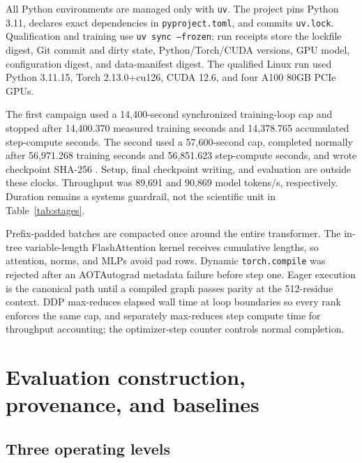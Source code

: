 \documentclass{article}
\newcommand{\code}[1]{\texttt{#1}}
\begin{document}
All Python environments are managed only with \texttt{uv}. The project pins
Python 3.11, declares exact dependencies in \code{pyproject.toml}, and commits
\code{uv.lock}. Qualification and training use \code{uv sync --frozen}; run
receipts store the lockfile digest, Git commit and dirty state, Python/Torch/CUDA
versions, GPU model, configuration digest, and data-manifest digest. The
qualified Linux run used Python 3.11.15, Torch 2.13.0+cu126, CUDA 12.6, and four
A100 80GB PCIe GPUs.

The first campaign used a 14,400-second synchronized training-loop cap and
stopped after 14,400.370 measured training seconds and 14,378.765 accumulated
step-compute seconds. The second used a 57,600-second cap, completed normally
after 56,971.268 training seconds and 56,851.623 step-compute seconds, and
wrote checkpoint SHA-256
.
Setup, final checkpoint writing, and evaluation are outside these clocks.
Throughput was 89,691 and 90,869 model tokens/s, respectively. Duration remains
a systems guardrail, not the scientific unit in Table~\ref{tab:stages}.

Prefix-padded batches are compacted once around the entire transformer. The
in-tree variable-length FlashAttention kernel receives cumulative lengths, so
attention, norms, and MLPs avoid pad rows. Dynamic \code{torch.compile} was
rejected after an AOTAutograd metadata failure before step one. Eager execution
is the canonical path until a compiled graph passes parity at the 512-residue
context. DDP max-reduces elapsed wall time at loop boundaries so every rank
enforces the same cap, and separately max-reduces step compute time for
throughput accounting; the optimizer-step counter controls normal completion.

\section{Evaluation construction, provenance, and baselines}
\label{app:evaluation}

\subsection{Three operating levels}
\end{document}
